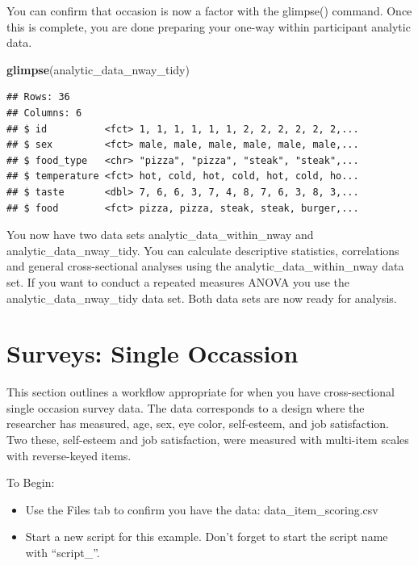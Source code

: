 \documentclass[
]{krantz}
\makeatletter
\newenvironment{Shaded}{\begin{snugshade}}{\end{snugshade}}
\newcommand{\KeywordTok}[1]{\textcolor[rgb]{0.27,0.27,0.27}{\textbf{#1}}}
\newcommand{\NormalTok}[1]{#1}
\newenvironment{kframe}{%
\medskip{}
\setlength{\fboxsep}{.8em}
 \def\at@end@of@kframe{}%
 \ifinner\ifhmode%
  \def\at@end@of@kframe{\end{minipage}}%
  \begin{minipage}{\columnwidth}%
 \fi\fi%
 \def\FrameCommand##1{\hskip\@totalleftmargin \hskip-\fboxsep
 \colorbox{shadecolor}{##1}\hskip-\fboxsep
     \hskip-\linewidth \hskip-\@totalleftmargin \hskip\columnwidth}%
 \MakeFramed {\advance\hsize-\width
   \@totalleftmargin\z@ \linewidth\hsize
   \@setminipage}}%
 {\par\unskip\endMakeFramed%
 \at@end@of@kframe}
\renewenvironment{Shaded}{\begin{kframe}}{\end{kframe}}
\makeatother
\begin{document}
You can confirm that occasion is now a factor with the glimpse() command. Once this is complete, you are done preparing your one-way within participant analytic data.

\begin{Shaded}
\begin{Highlighting}[]
\KeywordTok{glimpse}\NormalTok{(analytic_data_nway_tidy)}
\end{Highlighting}
\end{Shaded}

\begin{verbatim}
## Rows: 36
## Columns: 6
## $ id          <fct> 1, 1, 1, 1, 1, 1, 2, 2, 2, 2, 2, 2,...
## $ sex         <fct> male, male, male, male, male, male,...
## $ food_type   <chr> "pizza", "pizza", "steak", "steak",...
## $ temperature <fct> hot, cold, hot, cold, hot, cold, ho...
## $ taste       <dbl> 7, 6, 6, 3, 7, 4, 8, 7, 6, 3, 8, 3,...
## $ food        <fct> pizza, pizza, steak, steak, burger,...
\end{verbatim}

You now have two data sets analytic\_data\_within\_nway and analytic\_data\_nway\_tidy. You can calculate descriptive statistics, correlations and general cross-sectional analyses using the analytic\_data\_within\_nway data set. If you want to conduct a repeated measures ANOVA you use the analytic\_data\_nway\_tidy data set. Both data sets are now ready for analysis.

\hypertarget{surveys-single-occassion}{%
\section{Surveys: Single Occassion}\label{surveys-single-occassion}}

This section outlines a workflow appropriate for when you have cross-sectional single occasion survey data. The data corresponds to a design where the researcher has measured, age, sex, eye color, self-esteem, and job satisfaction. Two these, self-esteem and job satisfaction, were measured with multi-item scales with reverse-keyed items.

To Begin:

\begin{itemize}
\item
  Use the Files tab to confirm you have the data: data\_item\_scoring.csv
\item
  Start a new script for this example. Don't forget to start the script name with ``script\_''.
\end{itemize}
\end{document}
